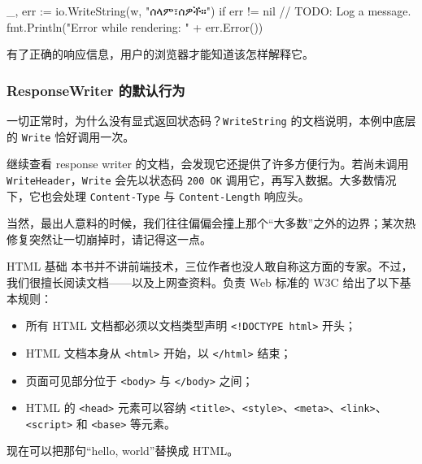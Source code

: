 \begin{gocode}[]
_, err := io.WriteString(w, "ሰላም፣ሰዎች።")
if err != nil {
    // TODO: Log a message.
    fmt.Println("Error while rendering: " + err.Error())
}
\end{gocode}

有了正确的响应信息，用户的浏览器才能知道该怎样解释它。

\subsubsection{ResponseWriter 的默认行为}

一切正常时，为什么没有显式返回状态码？\texttt{WriteString} 的文档说明，本例中底层的 \texttt{Write} 恰好调用一次。

继续查看 response writer 的文档，会发现它还提供了许多方便行为。若尚未调用 \texttt{WriteHeader}，\texttt{Write} 会先以状态码 \texttt{200 OK} 调用它，再写入数据。大多数情况下，它也会处理 \texttt{Content-Type} 与 \texttt{Content-Length} 响应头。

当然，最出人意料的时候，我们往往偏偏会撞上那个“大多数”之外的边界；某次热修复突然让一切崩掉时，请记得这一点。

\begin{infobox}{HTML 基础}
本书并不讲前端技术，三位作者也没人敢自称这方面的专家。不过，我们很擅长阅读文档——以及上网查资料。负责 Web 标准的 W3C 给出了以下基本规则：
\begin{itemize}
  \item 所有 HTML 文档都必须以文档类型声明 \texttt{<!DOCTYPE html>} 开头；
  \item HTML 文档本身从 \texttt{<html>} 开始，以 \texttt{</html>} 结束；
  \item 页面可见部分位于 \texttt{<body>} 与 \texttt{</body>} 之间；
  \item HTML 的 \texttt{<head>} 元素可以容纳 \texttt{<title>}、\texttt{<style>}、\texttt{<meta>}、\texttt{<link>}、\texttt{<script>} 和 \texttt{<base>} 等元素。
\end{itemize}
\end{infobox}

现在可以把那句“hello, world”替换成 HTML。


